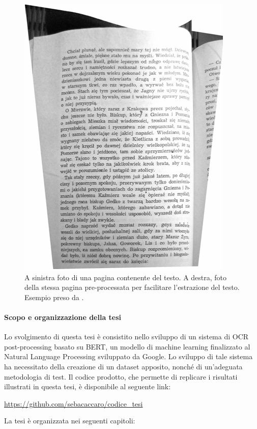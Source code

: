 \begin{figure}[H]
{\begin{minipage}{0.35\textwidth}
\includegraphics[width=\textwidth]{immagini/stato_arte/prep2}
\end{minipage}
\caption{A sinistra foto di una pagina contenente del testo. A destra, foto della stessa pagina pre-processata per facilitare l'estrazione del testo. Esempio preso da \cite{bieniecki2007image}.}
\label{fig:art_prep_ex}
}
\end{figure}
\noindent

\paragraph{Scopo e organizzazione della tesi} Lo svolgimento di questa tesi è consistito nello sviluppo di un sistema di OCR post-processing basato su BERT, un modello di machine learning finalizzato al Natural Language Processing sviluppato da Google. Lo sviluppo di tale sistema ha necessitato della creazione di un dataset apposito, nonché di un'adeguata metodologia di test. Il codice prodotto, che permette di replicare i risultati illustrati in questa tesi, è disponibile al seguente link:
\begin{center}
\url{https://github.com/sebacaccaro/codice_tesi}
\end{center}
\noindent
La tesi è organizzata nei seguenti capitoli:


